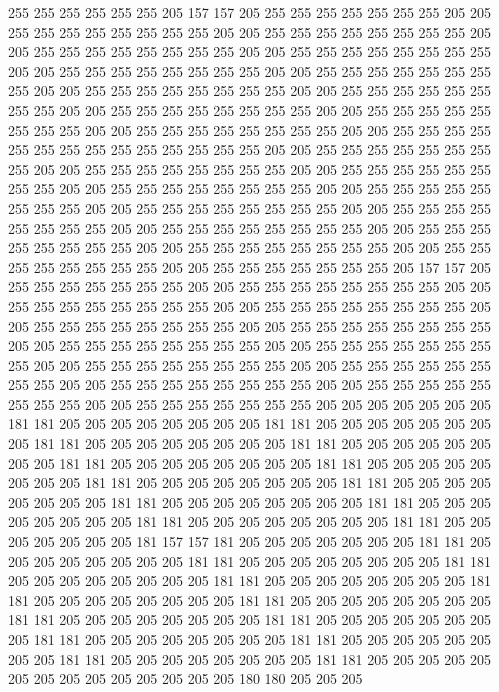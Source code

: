 255 255 255 255 255 255 205 157 157 205 255 255 255 255 255 255 255 205 205 255
255 255 255 255 255 255 255 205 205 255 255 255 255 255 255 255 255 205 205 255
255 255 255 255 255 255 255 205 205 255 255 255 255 255 255 255 255 205 205 255
255 255 255 255 255 255 255 205 205 255 255 255 255 255 255 255 255 205 205 255
255 255 255 255 255 255 255 205 205 255 255 255 255 255 255 255 255 205 205 255
255 255 255 255 255 255 255 205 205 255 255 255 255 255 255 255 255 205 205 255
255 255 255 255 255 255 255 205 205 255 255 255 255 255 255 255 255 255 255 255
255 255 255 205 205 255 255 255 255 255 255 255 255 205 205 255 255 255 255 255
255 255 255 205 205 255 255 255 255 255 255 255 255 205 205 255 255 255 255 255
255 255 255 205 205 255 255 255 255 255 255 255 255 205 205 255 255 255 255 255
255 255 255 205 205 255 255 255 255 255 255 255 255 205 205 255 255 255 255 255
255 255 255 205 205 255 255 255 255 255 255 255 255 205 205 255 255 255 255 255
255 255 255 205 205 255 255 255 255 255 255 255 255 205 205 255 255 255 255 255
255 255 205 157 157 205 255 255 255 255 255 255 255 205 205 255 255 255 255 255
255 255 255 205 205 255 255 255 255 255 255 255 255 205 205 255 255 255 255 255
255 255 255 205 205 255 255 255 255 255 255 255 255 205 205 255 255 255 255 255
255 255 255 205 205 255 255 255 255 255 255 255 255 205 205 255 255 255 255 255
255 255 255 205 205 255 255 255 255 255 255 255 255 205 205 255 255 255 255 255
255 255 255 205 205 255 255 255 255 255 255 255 255 205 205 255 255 255 255 255
255 255 255 205 205 255 255 255 255 255 255 255 205 205 205 205 205 205 205 181
181 205 205 205 205 205 205 205 205 181 181 205 205 205 205 205 205 205 205 181
181 205 205 205 205 205 205 205 205 181 181 205 205 205 205 205 205 205 205 181
181 205 205 205 205 205 205 205 205 181 181 205 205 205 205 205 205 205 205 181
181 205 205 205 205 205 205 205 205 181 181 205 205 205 205 205 205 205 205 181
181 205 205 205 205 205 205 205 205 181 181 205 205 205 205 205 205 205 205 181
181 205 205 205 205 205 205 205 205 181 181 205 205 205 205 205 205 205 181 157
157 181 205 205 205 205 205 205 205 181 181 205 205 205 205 205 205 205 205 181
181 205 205 205 205 205 205 205 205 181 181 205 205 205 205 205 205 205 205 181
181 205 205 205 205 205 205 205 205 181 181 205 205 205 205 205 205 205 205 181
181 205 205 205 205 205 205 205 205 181 181 205 205 205 205 205 205 205 205 181
181 205 205 205 205 205 205 205 205 181 181 205 205 205 205 205 205 205 205 181
181 205 205 205 205 205 205 205 205 181 181 205 205 205 205 205 205 205 205 181
181 205 205 205 205 205 205 205 205 205 205 205 205 205 205 180 180 205 205 205
